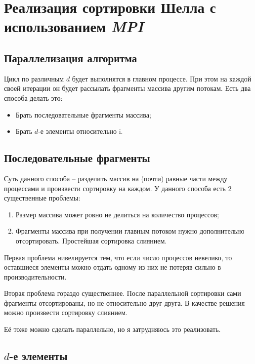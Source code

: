\section{Реализация сортировки Шелла с использованием \textit{MPI}}

\subsection{Параллелизация алгоритма}

Цикл по различным $d$ будет выполнятся в главном процессе.
При этом на каждой своей итерации он будет рассылать фрагменты массива другим потокам.
Есть два способа делать это:
\begin{itemize}
    \item Брать последовательные фрагменты массива;
    \item Брать $d$-е элементы относительно i.
\end{itemize}

\subsection{Последовательные фрагменты}

Суть данного способа -- разделить массив на (почти) равные части между процессами и произвести сортировку на каждом.
У данного способа есть 2 существенные проблемы:
\begin{enumerate}
    \item Размер массива может ровно не делиться на количество процессов;
    \item Фрагменты массива при получении главным потоком нужно дополнительно отсортировать. Простейшая сортировка слиянием.
\end{enumerate}

Первая проблема нивелируется тем, что если число процессов невелико, то оставшиеся элементы можно отдать одному из них не потеряв сильно в производительности.

Вторая проблема гораздо существеннее. 
После параллельной сортировки сами фрагменты отсортированы, но не относительно друг-друга.
В качестве решения можно произвести сортировку слиянием.

Её тоже можно сделать параллельно, но я затрудняюсь это реализовать.

\subsection{$d$-е элементы}

